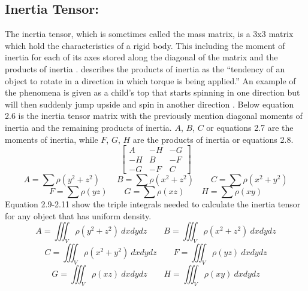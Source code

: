 \subsection{Inertia Tensor:}
The inertia tensor, which is sometimes called the mass matrix, is a 3x3 matrix which hold the characteristics of a rigid body.
This including the moment of inertia for each of its axes stored along the diagonal of the matrix and the products of inertia \citep{millington2007game}.
\citet{millington2007game} describes the products of inertia as the “tendency of an object to rotate in a direction in which torque is being applied.”
An example of the phenomena is given as a child’s top that starts spinning in one direction but will then suddenly jump upside and spin in another direction \citep{millington2007game}. 
Below equation 2.6 is the inertia tensor matrix with the previously mention diagonal moments of inertia and the remaining products of inertia.
$A$, $B$, $C$ or equations 2.7 are the moments of inertia, while $F$, $G$, $H$ are the products of inertia or equations 2.8. 
\begin{equation}\label{ma:Inertia Tensor}
\begin{bmatrix}
  A & -H & -G \\
  -H & B & -F \\
  -G & -F & C
\end{bmatrix}
\end{equation}
\begin{equation}\label{eq:Moments of Inertia}
A=\sum\rho\left({y}^{2}+{z}^{2}\right)
\qquad
B=\sum\rho\left({x}^{2}+{z}^{2}\right)
\qquad
C=\sum\rho\left({x}^{2}+{y}^{2}\right)
\end{equation}
\begin{equation}\label{eq:Product of Inertia}
F=\sum\rho\left(yz\right)
\qquad
G=\sum\rho\left(xz\right)
\qquad
H=\sum\rho\left(xy\right)
\end{equation}
Equation 2.9-2.11 show the triple integrals needed to calculate the inertia tensor for any object that has uniform density. 
\begin{equation}\label{eq:AB Triple Integral}
A=\iiint_{V} \rho({y}^{2}+{z}^{2})\  dx dy dz
\qquad
B=\iiint_{V} \rho({x}^{2}+{z}^{2})\ dx dy dz
\end{equation}
\begin{equation}\label{eq:CF Triple Integral}
C=\iiint_{V} \rho({x}^{2}+{y}^{2})\ dx dy dz
\qquad
F=\iiint_{V} \rho(yz)\ dx dy dz
\end{equation}
\begin{equation}\label{eq:GH Triple Integral}
G=\iiint_{V} \rho(xz)\ dx dy dz
\qquad
H=\iiint_{V} \rho(xy)\ dx dy dz
\end{equation}